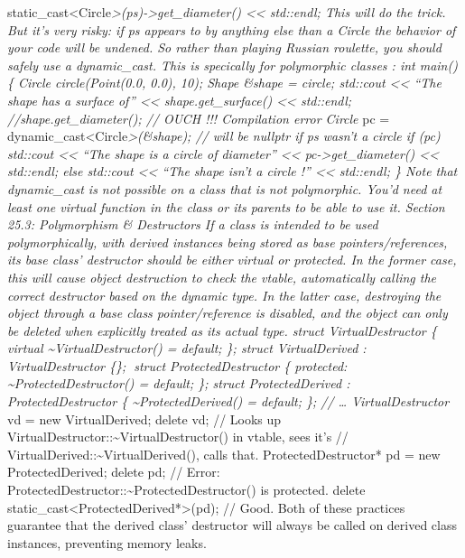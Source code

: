 static\_cast\textless Circle\emph{\textgreater(ps)-\textgreater get\_diameter()
\textless\textless{} std::endl; This will do the trick. But it's very
risky: if ps appears to by anything else than a Circle the behavior of
your code will be undened. So rather than playing Russian roulette, you
should safely use a dynamic\_cast. This is specically for polymorphic
classes : int main() \{ Circle circle(Point(0.0, 0.0), 10); Shape
\&shape = circle; std::cout \textless\textless{} ``The shape has a
surface of'' \textless\textless{} shape.get\_surface()
\textless\textless{} std::endl; //shape.get\_diameter(); // OUCH !!!
Compilation error Circle }pc =
dynamic\_cast\textless Circle\emph{\textgreater(\&shape); // will be
nullptr if ps wasn't a circle if (pc) std::cout \textless\textless{}
``The shape is a circle of diameter'' \textless\textless{}
pc-\textgreater get\_diameter() \textless\textless{} std::endl; else
std::cout \textless\textless{} ``The shape isn't a circle !''
\textless\textless{} std::endl; \} Note that dynamic\_cast is not
possible on a class that is not polymorphic. You'd need at least one
virtual function in the class or its parents to be able to use it.
Section 25.3: Polymorphism \& Destructors If a class is intended to be
used polymorphically, with derived instances being stored as base
pointers/references, its base class' destructor should be either virtual
or protected. In the former case, this will cause object destruction to
check the vtable, automatically calling the correct destructor based on
the dynamic type. In the latter case, destroying the object through a
base class pointer/reference is disabled, and the object can only be
deleted when explicitly treated as its actual type. struct
VirtualDestructor \{ virtual \textasciitilde VirtualDestructor() =
default; \}; struct VirtualDerived : VirtualDestructor \{\}; struct
ProtectedDestructor \{ protected: \textasciitilde ProtectedDestructor()
= default; \}; struct ProtectedDerived : ProtectedDestructor \{
\textasciitilde ProtectedDerived() = default; \}; // \ldots{}
VirtualDestructor} vd = new VirtualDerived; delete vd; // Looks up
VirtualDestructor::\textasciitilde VirtualDestructor() in vtable, sees
it's // VirtualDerived::\textasciitilde VirtualDerived(), calls that.
ProtectedDestructor* pd = new ProtectedDerived; delete pd; // Error:
ProtectedDestructor::\textasciitilde ProtectedDestructor() is protected.
delete static\_cast\textless ProtectedDerived*\textgreater(pd); // Good.
Both of these practices guarantee that the derived class' destructor
will always be called on derived class instances, preventing memory
leaks.


